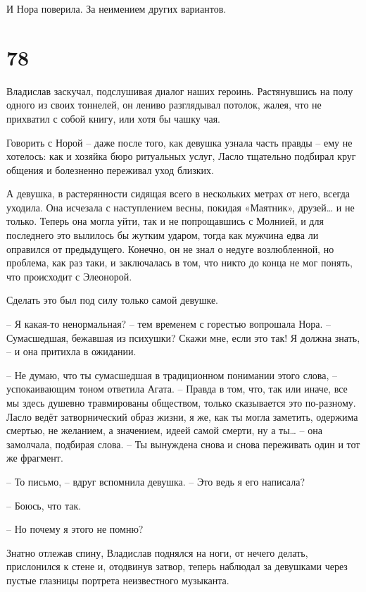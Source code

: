 \documentclass[
  a5paperpaper,
  DIV=11,
  numbers=noendperiod]{scrreprt}
\begin{document}
И Нора поверила. За неимением других вариантов.

\section*{78}\label{78}


Владислав заскучал, подслушивая диалог наших героинь. Растянувшись на
полу одного из своих тоннелей, он лениво разглядывал потолок, жалея, что
не прихватил с собой книгу, или хотя бы чашку чая.

Говорить с Норой -- даже после того, как девушка узнала часть правды --
ему не хотелось: как и хозяйка бюро ритуальных услуг, Ласло тщательно
подбирал круг общения и болезненно переживал уход близких.

А девушка, в растерянности сидящая всего в нескольких метрах от него,
всегда уходила. Она исчезала с наступлением весны, покидая «Маятник»,
друзей\ldots{} и не только. Теперь она могла уйти, так и не попрощавшись
с Молнией, и для последнего это вылилось бы жутким ударом, тогда как
мужчина едва ли оправился от предыдущего. Конечно, он не знал о недуге
возлюбленной, но проблема, как раз таки, и заключалась в том, что никто
до конца не мог понять, что происходит с Элеонорой.

Сделать это был под силу только самой девушке.

-- Я какая-то ненормальная? -- тем временем с горестью вопрошала Нора.
-- Сумасшедшая, бежавшая из психушки? Скажи мне, если это так! Я должна
знать, -- и она притихла в ожидании.

-- Не думаю, что ты сумасшедшая в традиционном понимании этого слова, --
успокаивающим тоном ответила Агата. -- Правда в том, что, так или иначе,
все мы здесь душевно травмированы обществом, только сказывается это
по-разному. Ласло ведёт затворнический образ жизни, я же, как ты могла
заметить, одержима смертью, не желанием, а значением, идеей самой
смерти, ну а ты\ldots{} -- она замолчала, подбирая слова. -- Ты
вынуждена снова и снова переживать один и тот же фрагмент.

-- То письмо, -- вдруг вспомнила девушка. -- Это ведь я его написала?

-- Боюсь, что так.

-- Но почему я этого не помню?

Знатно отлежав спину, Владислав поднялся на ноги, от нечего делать,
прислонился к стене и, отодвинув затвор, теперь наблюдал за девушками
через пустые глазницы портрета неизвестного музыканта.
\end{document}
